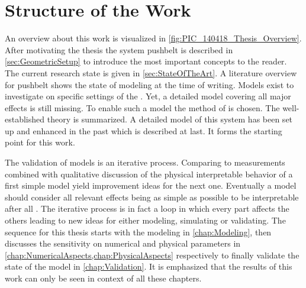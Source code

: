 \section{Structure of the Work}
%
%
An overview about this work is visualized in \cref{fig:PIC_140418_Thesis_Overview}. 
After motivating the thesis the system pushbelt \CVT is described in \cref{sec:GeometricSetup} to introduce the most important concepts to the reader.
The current research state is given in \cref{sec:StateOfTheArt}.
A literature overview for pushbelt \CVTs shows the state of modeling at the time of writing.
Models exist to investigate on specific settings of the \CVT.
Yet, a detailed model covering all major effects is still missing.
To enable such a model the method of \MBS is chosen.
The well-established theory is summarized. 
A detailed model of this system has been set up and enhanced in the past which is described at last.
It forms the starting point for this work. 
\par

The validation of models is an iterative process.
Comparing to measurements combined  with qualitative discussion of the physical interpretable behavior of a first simple model yield improvement ideas for the next one.
Eventually a model should consider all relevant effects being as simple as possible to be interpretable after all \cite{ulbrich_maschinendynamik_1996}.
The iterative process is in fact a loop in which every part affects the others leading to new ideas for either modeling, simulating or validating.
The sequence for this thesis starts with the modeling in \cref{chap:Modeling}, then discusses the sensitivity on numerical and physical parameters in \cref{chap:NumericalAspects,chap:PhysicalAspects} respectively to finally validate the state of the model in \cref{chap:Validation}.
It is emphasized that the results of this work can only be seen in context of all these chapters.
\par

